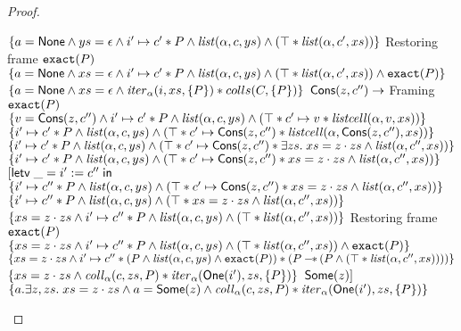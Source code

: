 \begin{proof}
\begin{itemize}
\begin{specification}
\nextline \> \> $\{{a = \mathsf{None} \land ys = \epsilon \land i' \mapsto c' * P \land \mathit{list}(\alpha, c, ys)  \land (\top * \mathit{list}(\alpha, c', xs)) }\}$ 
\nextline \> \> Restoring frame $\mathtt{exact}({P})$ 
\nextline \> \> $\{{a = \mathsf{None} \land xs = \epsilon \land i' \mapsto c' * P \land \mathit{list}(\alpha, c, ys) \land (\top * \mathit{list}(\alpha, c', xs)) \land \mathtt{exact}({P})}\}$ 
\nextline \> \> $\{{a = \mathsf{None} \land xs = \epsilon \land \mathit{iter}_\alpha(i, xs, \{{P}\}) * colls(C, \{{P}\})}\}$
\nextline \> $\mathsf{Cons}(z, c'') \to$ 
\nextline \> \> Framing $\mathtt{exact}({P})$
\nextline \> \> $\{{v = \mathsf{Cons}(z, c'') \land i' \mapsto c' * P \land \mathit{list}(\alpha,c,ys) \land (\top * c' \mapsto v * \mathit{listcell}(\alpha, v, xs))}\}$  
\nextline \> \> $\{{i' \mapsto c' * P \land \mathit{list}(\alpha,c,ys) \land (\top * c' \mapsto \mathsf{Cons}(z,c'') * \mathit{listcell}(\alpha, \mathsf{Cons}(z,c''), xs))}\}$  
\nextline \> \> $\{{i' \mapsto c' * P \land \mathit{list}(\alpha,c,ys) \land (\top * c' \mapsto \mathsf{Cons}(z,c'') * \exists zs.\; xs = z\cdot zs \land \mathit{list}(\alpha, c'', xs))}\}$  
\nextline \> \> $\{{i' \mapsto c' * P \land \mathit{list}(\alpha,c,ys) \land (\top * c' \mapsto \mathsf{Cons}(z,c'') * xs = z\cdot zs \land \mathit{list}(\alpha, c'', xs))}\}$  
\nextline \> \> $[\mathsf{letv}\;\_ = i' := c''\;\mathsf{in}\;$ 
\nextline \> \> $\{{i' \mapsto c'' * P \land \mathit{list}(\alpha,c,ys) \land (\top * c' \mapsto \mathsf{Cons}(z,c'') * xs = z\cdot zs \land \mathit{list}(\alpha, c'', xs))}\}$  
\nextline \> \> $\{{i' \mapsto c'' * P \land \mathit{list}(\alpha,c,ys) \land (\top * xs = z\cdot zs \land \mathit{list}(\alpha, c'', xs))}\}$  
\nextline \> \> $\{{xs = z\cdot zs \land i' \mapsto c'' * P \land \mathit{list}(\alpha,c,ys) \land (\top * \mathit{list}(\alpha, c'', xs))}\}$  
\nextline \> \> Restoring frame $\mathtt{exact}({P})$ 
\nextline \> \> $\{{xs = z\cdot zs \land i' \mapsto c'' * P \land \mathit{list}(\alpha,c,ys) \land (\top * \mathit{list}(\alpha, c'', xs)) \land \mathtt{exact}({P})}\}$  
\nextline \> \> $\{{xs = z\cdot zs \land i' \mapsto c'' * (P \land \mathit{list}(\alpha,c,ys) \land \mathtt{exact}({P})) * (P -\!\!*\, (P \land (\top * \mathit{list}(\alpha, c'', xs))))}\}$  
\nextline \> \> $\{{xs = z\cdot zs \land \mathit{coll}_\alpha(c, zs, P) * \mathit{iter}_\alpha(\mathsf{One}(i'),zs,\{{P}\})}\}$  
\nextline \> \> $\mathsf{Some}(z)]$ 
\nextline \> \> $\{{a. \exists z, zs.\; xs = z\cdot zs \land a = \mathsf{Some}(z) \land \mathit{coll}_\alpha(c, zs, P) * \mathit{iter}_\alpha(\mathsf{One}(i'),zs,\{{P}\})}\}$  
\end{specification}


\end{itemize}
\end{proof}
